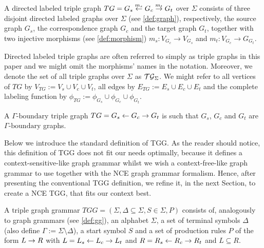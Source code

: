 \documentclass[runningheads]{llncs}
\begin{document}
\begin{definition}
	A directed labeled triple graph $TG = G_s \overset{m_s}{\leftarrow} G_c \overset{m_t}{\rightarrow} G_t$ over $\Sigma$ consists of three disjoint directed labeled graphs over $\Sigma$ (see \ref{def:graph}), respectively, the source graph $G_s$, the correspondence graph $G_c$ and the target graph $G_t$, together with two injective morphisms (see \ref{def:morphism}) $m_s: V_{G_c} \to V_{G_s}$ and $m_t : V_{G_c} \to G_{G_t}$.
\end{definition}

Directed labeled triple graphs are often referred to simply as triple graphs in this paper and we might omit the morphisms' names in the notation. Moreover, we denote the set of all triple graphs over $\Sigma$ as $\mathcal{TG}_{\Sigma}$. We might refer to all vertices of $TG$ by $V_{TG}:= V_s \cup V_c \cup V_t$, all edges by $E_{TG}:= E_s \cup E_c \cup E_t$ and the complete labeling function by $\phi_{TG}:= \phi_{G_s} \cup \phi_{G_c} \cup \phi_{G_t}$.

\begin{definition}
	A $\Gamma\text{-boundary}$ triple graph $TG = G_s \overset{}{\leftarrow} G_c \overset{}{\rightarrow} G_t$ is such that $G_s$, $G_c$ and $G_t$ are $\Gamma\text{-boundary}$ graphs.
\end{definition}


Below we introduce the standard definition of TGG. As the reader should notice, this definition of TGG does not fit our needs optimally, because it defines a context-sensitive-like graph grammar whilst we wish a context-free-like graph grammar to use together with the NCE graph grammar formalism. Hence, after presenting the conventional TGG definition, we refine it, in the next Section, to create a NCE TGG, that fits our context best.

\begin{definition}
	\label{def:stgg}
	A triple graph grammar $TGG = (\Sigma, \Delta \subseteq \Sigma, S \in \Sigma, P)$ consists of, analogously to graph grammars (see \ref{def:gg}), an alphabet $\Sigma$, a set of terminal symbols $\Delta$ (also define $\Gamma := \Sigma \setminus \Delta$), a start symbol $S$ and a set of production rules $P$ of the form $L \to R$ with $L = L_s \overset{}{\leftarrow} L_c \overset{}{\rightarrow} L_t$ and $R = R_s \overset{}{\leftarrow} R_c \overset{}{\rightarrow} R_t$ and $L \subseteq R$.
\end{definition}

\end{document}

